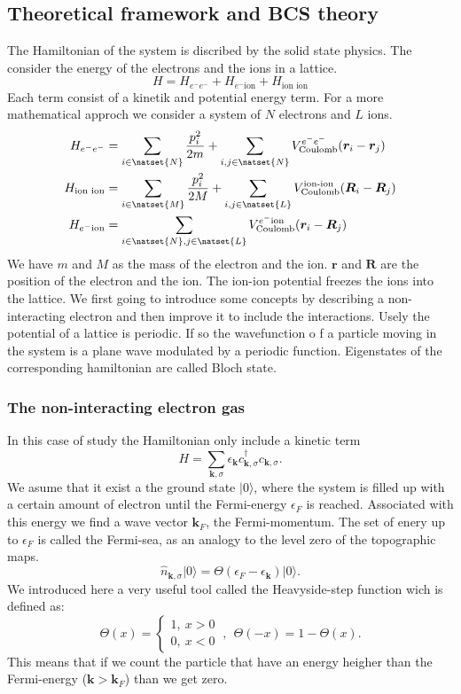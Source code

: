 \documentclass[../main.tex]{subfile}
\begin{document}
\subsection{Theoretical framework and BCS theory}
The Hamiltonian of the system is discribed by the solid state physics. The consider the energy of the electrons and the ions in a lattice.
\[
    H = H_{e^-e^-} + H_{e^-\text{ion}} + H_{\text{ion ion}}
\]
Each term consist of a kinetik and potential energy term. For a more mathematical approch we consider a system of $N$ electrons and $L$ ions.
\begin{align*}
    H_{e^-e^-} &= \sum_{i \in \natset{N}} \frac{p_i^2}{2m} + \sum_{i,j\in\natset{N}} V_{\text{Coulomb}}^{e^-e^-}(\bm{r}_i-\bm{r}_j) \\
    H_{\text{ion ion}} &=  \sum_{i \in \natset{M}} \frac{p_i^2}{2M} + \sum_{i,j\in\natset{L}} V_{\text{Coulomb}}^{\text{ion-ion}}(\bm{R}_i-\bm{R}_j) \\
    H_{e^-\text{ion}} &= \sum_{i\in \natset{N},j\in \natset{L}} V_{\text{Coulomb}}^{e^-\text{ion}}(\bm{r}_i-\bm{R}_j)
\end{align*}
We have $m$ and $M$ as the mass of the electron and the ion. $\bm{r}$ and $\bm{R}$ are the position of the electron and the ion. The ion-ion potential
freezes the ions into the lattice. 
We first going to introduce some concepts by describing a non-interacting electron and then improve it to include the interactions.
Usely the potential of a lattice is periodic. If so the wavefunction o f a particle moving in the system is a plane wave modulated
by a periodic function. Eigenstates of the corresponding hamiltonian are called Bloch state.

\subsubsection{The non-interacting electron gas}
In this case of study the Hamiltonian only include a kinetic term
\begin{equation}\label{eq:NonInteractingHamiltonian}
    H=\sum_{\bm{k},\sigma} \epsilon_{\bm{k}} c_{\bm{k},\sigma}^{\dagger}c_{\bm{k},\sigma}.
\end{equation}
We asume that it exist a the ground state $|0\rangle$, where the system is filled up with a certain amount of electron until the Fermi-energy $\epsilon_F$ is reached. Associated with this
energy we find a wave vector $\bm{k}_F$, the Fermi-momentum. The set of enery up to $\epsilon_F$ is called the Fermi-sea, as an analogy to the level zero of the topographic maps.
\[
    \hat{n}_{\bm{k},\sigma} |0\rangle = \Theta(\epsilon_F - \epsilon_{\bm{k}})|0\rangle.
\]
We introduced here a very useful tool called the Heavyside-step function wich is defined as: 
\begin{equation}\label{eq:Heavyside}
    \Theta(x) = \begin{cases}
        1, ~x > 0\\
        0, ~x < 0
    \end{cases} ~ , ~~ \Theta(-x) = 1 - \Theta(x).
\end{equation}
This means that if we count the particle that have an energy heigher than the Fermi-energy ($\bm{k}>\bm{k}_F$) than we get zero.\\
\end{document}
